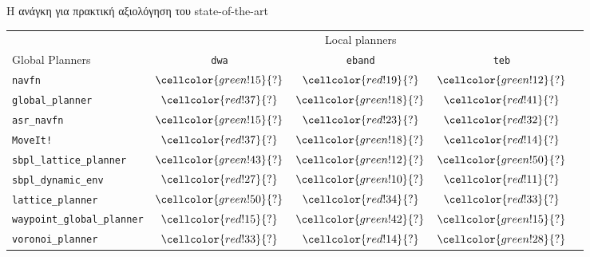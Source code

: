 \begin{frame}{Η ανάγκη για πρακτική αξιολόγηση του state-of-the-art}
{\footnotesize
\begin{table}[h]
\begin{tabular}{lcccc}
  & \multicolumn{3}{c}{Local planners} \\
  \cline{2-4}
  Global Planners                     & \texttt{dwa}                               & \texttt{eband}                             & \texttt{teb} \\ \toprule
  \texttt{navfn}                     & $\cellcolor{green!15}{?}$         & $\cellcolor{red!19}{?}$            & $\cellcolor{green!12}{?}$         \\
  \texttt{global\_planner}           & $\cellcolor{red!37}{?}$         & $\cellcolor{green!18}{?}$            & $\cellcolor{red!41}{?}$         \\
  \texttt{asr\_navfn}                & $\cellcolor{green!15}{?}$         & $\cellcolor{red!23}{?}$            & $\cellcolor{red!32}{?}$         \\
  \texttt{MoveIt!}                   & $\cellcolor{red!37}{?}$         & $\cellcolor{green!18}{?}$            & $\cellcolor{red!14}{?}$         \\
  \texttt{sbpl\_lattice\_planner}    & $\cellcolor{green!43}{?}$         & $\cellcolor{green!12}{?}$            & $\cellcolor{green!50}{?}$         \\
  \texttt{sbpl\_dynamic\_env}        & $\cellcolor{red!27}{?}$         & $\cellcolor{green!10}{?}$            & $\cellcolor{red!11}{?}$         \\
  \texttt{lattice\_planner}          & $\cellcolor{green!50}{?}$         & $\cellcolor{red!34}{?}$            & $\cellcolor{red!33}{?}$         \\
  \texttt{waypoint\_global\_planner} & $\cellcolor{red!15}{?}$         & $\cellcolor{green!42}{?}$            & $\cellcolor{green!15}{?}$         \\
  \texttt{voronoi\_planner}          & $\cellcolor{red!33}{?}$         & $\cellcolor{red!14}{?}$            & $\cellcolor{green!28}{?}$         \\ \bottomrule
\end{tabular}
\end{table}
}

\end{frame}

